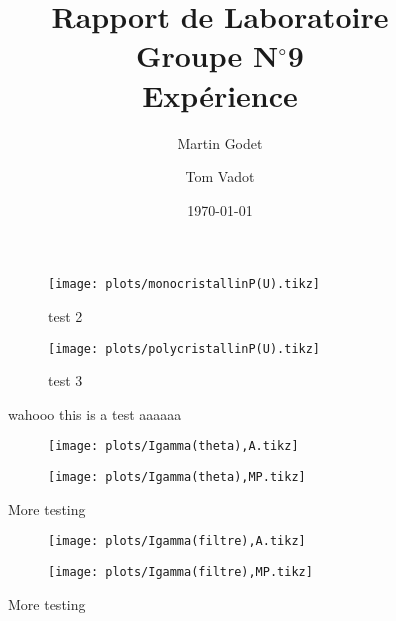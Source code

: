 \documentclass[a4paper, 12pt, oneside]{article}
\begin{document}
\title{Rapport de Laboratoire\\Groupe N$^\circ$9\\Expérience}
\author{Martin Godet \and Tom Vadot}
\date{\today}

\maketitle

\begin{figure}
    \centering
    \begin{subfigure}[c]{0.4\linewidth}
        \centering
        \texttt{[image: plots/monocristallinP(U).tikz]}
        \label{fig:1b}
        \caption{test 2}
    \end{subfigure}
    \begin{subfigure}[c]{0.4\linewidth}
        \centering
        \texttt{[image: plots/polycristallinP(U).tikz]}
        \label{fig:1c}
        \caption{test 3}
    \end{subfigure}
    \caption{wahooo this is a test aaaaaa}
\end{figure}

\begin{figure}
    \centering
    \begin{subfigure}[c]{0.4\linewidth}
        \texttt{[image: plots/Igamma(theta),A.tikz]}
    \end{subfigure}
    \begin{subfigure}[c]{0.4\linewidth}
        \texttt{[image: plots/Igamma(theta),MP.tikz]}
    \end{subfigure}
    \caption{More testing}
    \label{fig:2}
\end{figure}

\begin{figure}
    \begin{subfigure}[c]{0.9\linewidth}
        \texttt{[image: plots/Igamma(filtre),A.tikz]}
    \end{subfigure}
    \newpage
    \begin{subfigure}[c]{0.9\linewidth}
        \texttt{[image: plots/Igamma(filtre),MP.tikz]}
    \end{subfigure}
    \caption{More testing}
    \label{fig:3}
\end{figure}







\nocite{*}  %
\printbibliography

\newpage

\begin{appendices}

\end{appendices}
\end{document}
